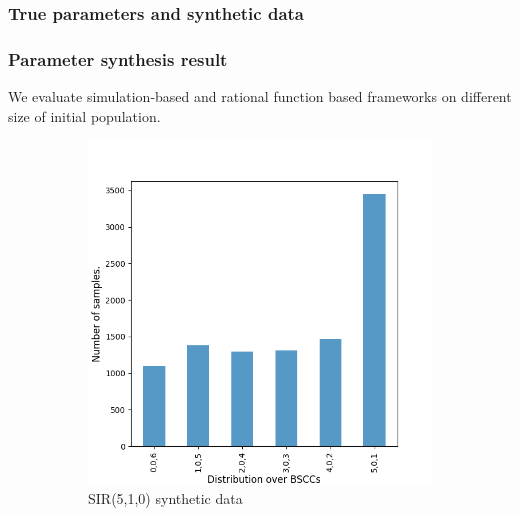 \subsubsection{True parameters and synthetic data}
\subsubsection{Parameter synthesis result}
We evaluate simulation-based and rational function based frameworks on different size of initial population.
\begin{figure}[H]
    \centering
    \begin{subfigure}{0.3\textwidth}
        \centering
        \includegraphics[width=\linewidth]{figures/sir510_data.png}
        \caption{SIR(5,1,0) synthetic data}
    \end{subfigure}
    \hfill
    \begin{subfigure}{0.3\textwidth}
        \centering

\end{subfigure}
\end{figure}
